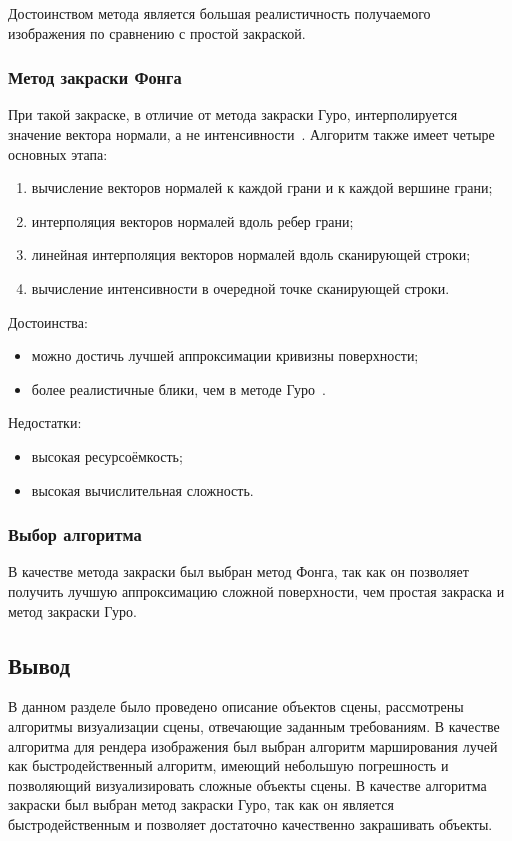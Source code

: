 Достоинством метода является большая реалистичность получаемого изображения
по сравнению с простой закраской.

\subsubsection{Метод закраски Фонга}
При такой закраске, в отличие от метода закраски Гуро, интерполируется значение вектора нормали, а не интенсивности~\cite{phong}.
Алгоритм также имеет четыре основных этапа:
\begin{enumerate}
  \item вычисление векторов нормалей к каждой грани и к каждой вершине грани;
  \item интерполяция векторов нормалей вдоль ребер грани;
  \item линейная интерполяция векторов нормалей вдоль сканирующей строки;
  \item вычисление интенсивности в очередной точке сканирующей строки.
\end{enumerate}

Достоинства:
\begin{itemize}
  \item можно достичь лучшей аппроксимации кривизны поверхности;
  \item более реалистичные блики, чем в методе Гуро~\cite{rogers}.
\end{itemize}

Недостатки:
\begin{itemize}
  \item высокая ресурсоёмкость;
  \item высокая вычислительная сложность.
\end{itemize}

\subsubsection{Выбор алгоритма}
В качестве метода закраски был выбран метод Фонга, так как он позволяет получить лучшую
аппроксимацию сложной поверхности, чем простая закраска и метод закраски Гуро.

\subsection*{Вывод}
В данном разделе было проведено описание объектов сцены, рассмотрены алгоритмы визуализации сцены, отвечающие заданным требованиям.
В качестве алгоритма для рендера изображения был выбран алгоритм марширования лучей как
быстродейственный алгоритм, имеющий небольшую погрешность и позволяющий визуализировать сложные объекты сцены.
В качестве алгоритма закраски был выбран метод закраски Гуро, так как он является быстродейственным и позволяет достаточно качественно закрашивать объекты.

\clearpage
